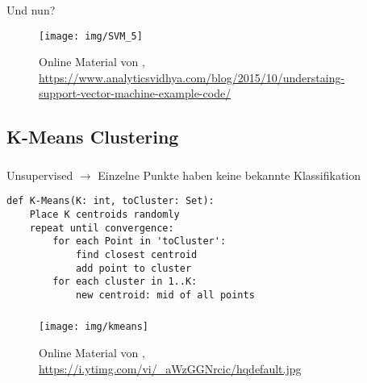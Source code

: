 \begin{frame}
    \frametitle{\insertsubsection}
    Und nun?
    \begin{figure}[H]
        \centering
        \texttt{[image: img/SVM\_5]}
        \caption{Online Material von \cite{ray2015}, \url{https://www.analyticsvidhya.com/blog/2015/10/understaing-support-vector-machine-example-code/}\label{fig:svm2}}
    \end{figure}
\end{frame}


\subsection{K-Means Clustering}

\begin{frame}[fragile]
    \frametitle{\insertsubsection}
    Unsupervised $\rightarrow$ Einzelne Punkte haben keine bekannte Klassifikation \cite{datamining2011}
    \vspace{1em}
    \begin{lstlisting}
def K-Means(K: int, toCluster: Set):
    Place K centroids randomly
    repeat until convergence:
        for each Point in 'toCluster':
            find closest centroid
            add point to cluster
        for each cluster in 1..K:
            new centroid: mid of all points
    \end{lstlisting}
    \cite{lavrenko2013}
\end{frame}

\begin{frame}
    \frametitle{\insertsubsection}

    \begin{figure}[H]
        \centering
        \texttt{[image: img/kmeans]}
        \caption{Online Material von \cite{lavrenko2013}, \url{https://i.ytimg.com/vi/_aWzGGNrcic/hqdefault.jpg}\label{fig:kmeans}}
    \end{figure}
\end{frame}
